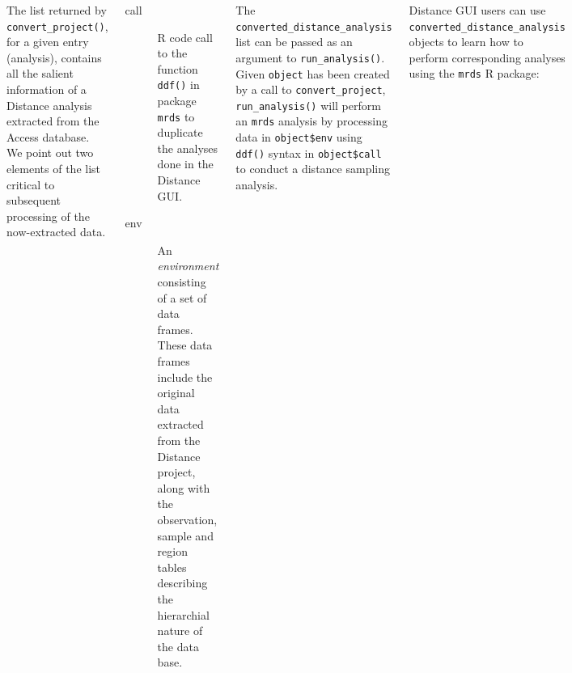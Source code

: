 \documentclass[14pt,a1paper,landscape]{tikzposter}
\begin{document}
\begin{columns}
%	
%	


{
	
	The list returned by \texttt{convert\_project()}, for a given entry (analysis), contains all the salient information of a Distance analysis extracted from the Access database.  We point out two elements of the list critical to subsequent processing of the now-extracted data.
	\begin{description}
		\item [call] R code call to the function \texttt{ddf()} in package \texttt{mrds} to duplicate the analyses done in the Distance GUI.
		\item [env] An \textit{environment} consisting of a set of data frames.  These data frames include the original data extracted from the Distance project, along with the observation, sample and region tables describing the hierarchial nature of the data base.
	\end{description}
	
	The \texttt{converted\_distance\_analysis} list can be passed as an argument to \texttt{run\_analysis()}.  Given \texttt{object} has been created by a call to \texttt{convert\_project}, \texttt{run\_analysis()} will perform an \texttt{mrds} analysis by processing data in \texttt{object\$env} using \texttt{ddf()} syntax in \texttt{object\$call} to conduct a distance sampling analysis.
} 


{
	Distance GUI users can use \texttt{converted\_distance\_analysis} objects to learn how to perform corresponding analyses using the \texttt{mrds} R package:
		
}
\end{columns}
\end{document}
